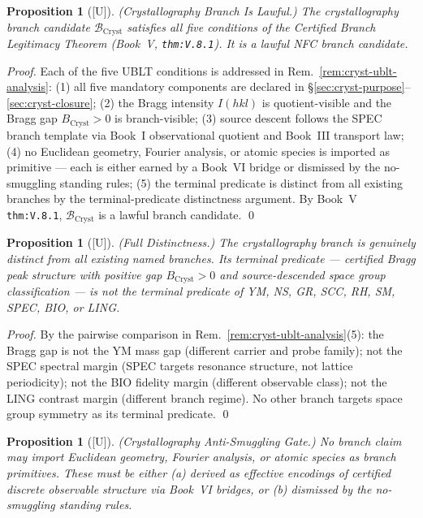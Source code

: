 \documentclass[12pt,oneside]{amsbook}
\theoremstyle{plain}
\newtheorem{proposition}[theorem]{Proposition}
\theoremstyle{definition}
\theoremstyle{remark}
\newcommand{\status}[1]{\textup{[#1]}}
\begin{document}
\begin{proposition}[\status{U}]\label{prop:cryst-lawful}
\textup{(Crystallography Branch Is Lawful.)}
The crystallography branch candidate $\mathcal{B}_{\mathrm{Cryst}}$
satisfies all five conditions of the Certified Branch Legitimacy
Theorem (Book~V, \texttt{thm:V.8.1}).  It is a lawful NFC branch
candidate.
\end{proposition}

\begin{proof}
Each of the five UBLT conditions is addressed in
Rem.~\ref{rem:cryst-ublt-analysis}: (1) all five mandatory
components are declared in §\ref{sec:cryst-purpose}--\ref{sec:cryst-closure};
(2) the Bragg intensity $I(hkl)$ is quotient-visible and the Bragg
gap $B_{\mathrm{Cryst}} > 0$ is branch-visible;
(3) source descent follows the SPEC branch template via Book~I
observational quotient and Book~III transport law;
(4) no Euclidean geometry, Fourier analysis, or atomic species is
imported as primitive --- each is either earned by a Book~VI bridge
or dismissed by the no-smuggling standing rules;
(5) the terminal predicate is distinct from all existing branches
by the terminal-predicate distinctness argument.
By Book~V \texttt{thm:V.8.1}, $\mathcal{B}_{\mathrm{Cryst}}$ is
a lawful branch candidate.
\qed
\end{proof}

\begin{proposition}[\status{U}]\label{prop:cryst-distinct}
\textup{(Full Distinctness.)}
The crystallography branch is genuinely distinct from all existing
named branches.  Its terminal predicate --- certified Bragg peak
structure with positive gap $B_{\mathrm{Cryst}} > 0$ and
source-descended space group classification --- is not the terminal
predicate of YM, NS, GR, SCC, RH, SM, SPEC, BIO, or LING.
\end{proposition}

\begin{proof}
By the pairwise comparison in Rem.~\ref{rem:cryst-ublt-analysis}(5):
the Bragg gap is not the YM mass gap (different carrier and probe
family); not the SPEC spectral margin (SPEC targets resonance
structure, not lattice periodicity); not the BIO fidelity margin
(different observable class); not the LING contrast margin
(different branch regime).  No other branch targets space group
symmetry as its terminal predicate.
\qed
\end{proof}

\begin{proposition}[\status{U}]\label{prop:cryst-anti-smuggle}
\textup{(Crystallography Anti-Smuggling Gate.)}
No branch claim may import Euclidean geometry, Fourier analysis,
or atomic species as branch primitives.  These must be either (a)
derived as effective encodings of certified discrete observable
structure via Book~VI bridges, or (b) dismissed by the
no-smuggling standing rules.
\end{proposition}
\end{document}
